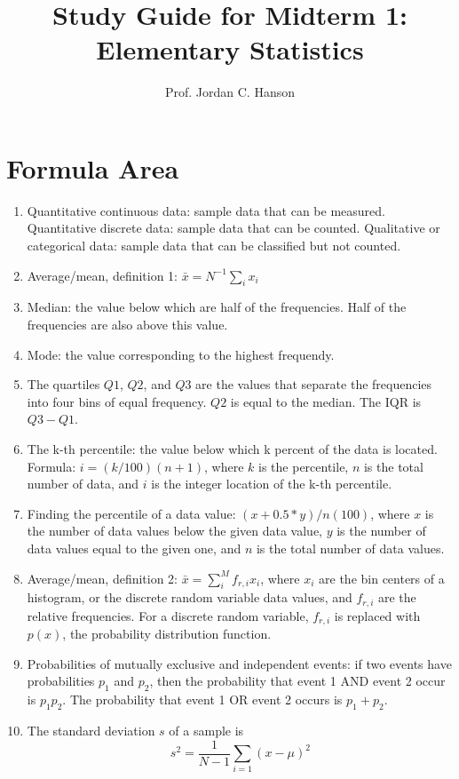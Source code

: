 \documentclass{article}
\begin{document}
\title{Study Guide for Midterm 1: Elementary Statistics}
\author{Prof. Jordan C. Hanson}

\maketitle

\section{Formula Area}

\begin{enumerate}
\item Quantitative continuous data: sample data that can be measured.  Quantitative discrete data: sample data that can be counted.  Qualitative or categorical data: sample data that can be classified but not counted.
\item Average/mean, definition 1: $\bar{x} = N^{-1} \sum_i x_i$
\item Median: the value below which are half of the frequencies.  Half of the frequencies are also above this value.
\item Mode: the value corresponding to the highest frequendy.
\item The quartiles $Q1$, $Q2$, and $Q3$ are the values that separate the frequencies into four bins of equal frequency. $Q2$ is equal to the median.  The IQR is $Q3 - Q1$.
\item The k-th percentile: the value below which k percent of the data is located.  Formula: $i = (k/100) (n+1)$, where $k$ is the percentile, $n$ is the total number of data, and $i$ is the integer location of the k-th percentile.
\item Finding the percentile of a data value: $(x+0.5*y)/n (100)$, where $x$ is the number of data values below the given data value, $y$ is the number of data values equal to the given one, and $n$ is the total number of data values.
\item Average/mean, definition 2: $\bar{x} = \sum_i^{M} f_{r,i} x_i$, where $x_i$ are the bin centers of a histogram, or the discrete random variable data values, and $f_{r,i}$ are the relative frequencies.  For a discrete random variable, $f_{r,i}$ is replaced with $p(x)$, the probability distribution function.
\item Probabilities of mutually exclusive and independent events: if two events have probabilities $p_1$ and $p_2$, then the probability that event 1 AND event 2 occur is $p_1 p_2$.  The probability that event 1 OR event 2 occurs is $p_1 + p_2$.
\item The standard deviation $s$ of a sample is 
\begin{equation}
s^2 = \frac{1}{N-1}\sum_{i=1} (x-\mu)^2
\end{equation}
\end{enumerate}
\end{document}
